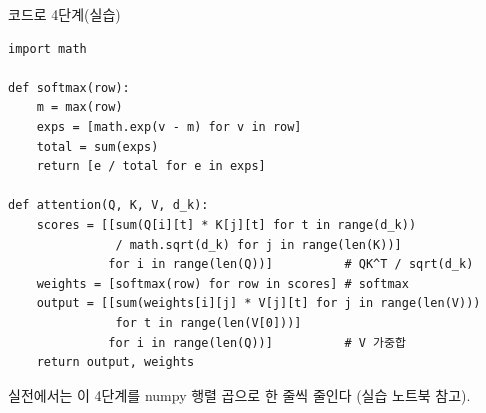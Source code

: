 \documentclass[aspectratio=169,11pt]{beamer}
\begin{document}
\begin{frame}[fragile]{코드로 4단계}(실습)
\begin{lstlisting}
import math

def softmax(row):
    m = max(row)
    exps = [math.exp(v - m) for v in row]
    total = sum(exps)
    return [e / total for e in exps]

def attention(Q, K, V, d_k):
    scores = [[sum(Q[i][t] * K[j][t] for t in range(d_k))
               / math.sqrt(d_k) for j in range(len(K))]
              for i in range(len(Q))]          # QK^T / sqrt(d_k)
    weights = [softmax(row) for row in scores] # softmax
    output = [[sum(weights[i][j] * V[j][t] for j in range(len(V)))
               for t in range(len(V[0]))]
              for i in range(len(Q))]          # V 가중합
    return output, weights
\end{lstlisting}
  {\footnotesize 실전에서는 이 4단계를 numpy 행렬 곱으로 한 줄씩
  줄인다 (실습 노트북 참고).}
\end{frame}

\end{document}
